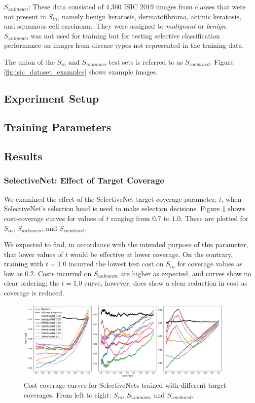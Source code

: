 \(S_{unknown}\): These data consisted of 4,360 ISIC 2019 images from classes that were not present in \(S_{in}\), namely benign keratosis, dermatofibroma, actinic keratosis, and squamous cell carcinoma. They were assigned to {\em malignant} or {\em benign}. \(S_{unknown}\) was not used for training but for testing selective classification performance on images from disease types not represented in the training data. 

The union of the \(S_{in}\) and \(S_{unknown}\) test sets is referred to as \(S_{combined}\). Figure \ref{fig:isic_dataset_examples} shows example images.

\subsection{Experiment Setup}

\subsection{Training Parameters}

\subsection{Results}
\subsubsection{SelectiveNet: Effect of Target Coverage}
We examined the effect of the SelectiveNet target-coverage parameter, $t$, when SelectiveNet's selection head is used to make selection decisions. Figure \ref{fig:sn_coverage} shows cost-coverage curves for values of $t$ ranging from $0.7$ to $1.0$. These are plotted for $S_{in}$, $S_{unknown}$, and $S_{combined}$. 

We expected to find, in accordance with the intended purpose of this parameter, that lower values of $t$ would be effective at lower coverage. On the contrary, training with $t=1.0$ incurred the lowest test cost on $S_{in}$ for coverage values as low as $0.2$. Costs incurred on $S_{unknown}$ are higher as expected, and curves show no clear ordering; the $t=1.0$ curve, however, does show a clear reduction in cost as coverage is reduced.

\begin{figure}[h]
	\centering
	\includegraphics[width=0.95\textwidth]{images/selectivenet_v2.png}
	\caption{Cost-coverage curves for SelectiveNets trained with different target coverages. From left to right: \(S_{in}\), \(S_{unknown}\) and  \(S_{combined}\).}
	\label{fig:sn_coverage}
\end{figure}


